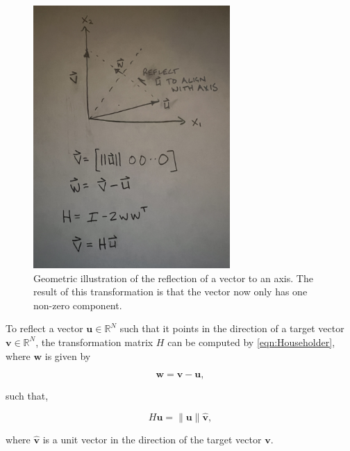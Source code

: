 \documentclass{article}
\begin{document}
\begin{figure}[h]
\centering
\includegraphics[width=75mm, angle=-90]{Householder2}
\caption{Geometric illustration of the reflection of a vector to an axis. The result of this transformation is that the vector now only has one non-zero component.}
\end{figure}

To reflect a vector $\mathbf{u}\in\mathbb{R}^N$ such that it points in the direction of a target vector $\mathbf{v}\in\mathbb{R}^N$, the transformation matrix $H$ can be computed by \eqref{eqn:Householder}, where $\mathbf{w}$ is given by

\begin{equation}
	\label{eqn:normal}
\mathbf{w} = \mathbf{v} - \mathbf{u},
\end{equation}

such that,

\begin{equation}
H\mathbf{u} = \|\mathbf{u}\|\mathbf{\hat{v}},
\end{equation}

where $\mathbf{\hat{v}}$ is a unit vector in the direction of the target vector $\mathbf{v}$.
\end{document}
